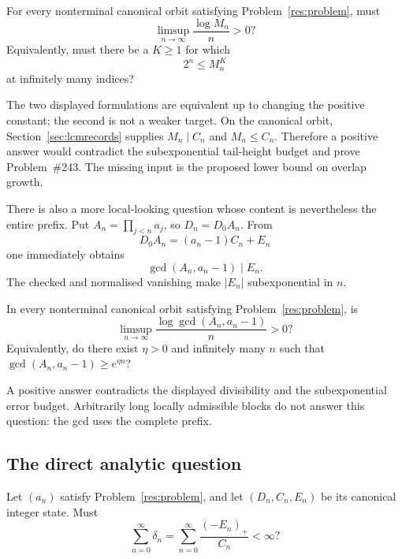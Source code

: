\begin{problem}\label{res:lcmheight}
For every nonterminal canonical orbit satisfying Problem~\ref{res:problem},
must
\[
 \limsup_{n\to\infty}\frac{\log M_n}{n}>0?
\]
Equivalently, must there be a $K\ge1$ for which
\[
 2^n\le M_n^K
\]
at infinitely many indices?
\end{problem}

\noindent The two displayed formulations are equivalent up to changing the
positive constant; the second is not a weaker target. On the canonical orbit,
Section~\ref{sec:lcmrecords} supplies $M_n\mid C_n$ and $M_n\le C_n$.
Therefore a positive answer would contradict the subexponential tail-height
budget and prove Problem~\#243. The missing input is the proposed lower
bound on overlap growth.

There is also a more local-looking question whose content is nevertheless the
entire prefix.  Put $A_n=\prod_{j<n}a_j$, so $D_n=D_0A_n$.  From
\[
 D_0A_n=(a_n-1)C_n+E_n
\]
one immediately obtains
\[
 \gcd(A_n,a_n-1)\mid E_n.
\]
The checked
and normalised vanishing make $|E_n|$ subexponential in $n$.

\begin{problem}\label{res:prefixgcd}
In every nonterminal canonical orbit satisfying Problem~\ref{res:problem}, is
\[
 \limsup_{n\to\infty}
 \frac{\log\gcd(A_n,a_n-1)}{n}>0?
\]
Equivalently, do there exist $\eta>0$ and infinitely many $n$ such that
$\gcd(A_n,a_n-1)\ge e^{\eta n}$?
\end{problem}

\noindent A positive answer contradicts the displayed divisibility and the
subexponential error budget.  Arbitrarily long locally admissible blocks do
not answer this question: the gcd uses the complete prefix.

\subsection{The direct analytic question}

\begin{problem}\label{res:masshyp}
Let $(a_n)$ satisfy Problem~\ref{res:problem}, and let $(D_n,C_n,E_n)$ be its
canonical integer state.  Must
\[
 \sum_{n=0}^{\infty}\delta_n
 =\sum_{n=0}^{\infty}\frac{(-E_n)_+}{C_n}<\infty ?
\]
\end{problem}

